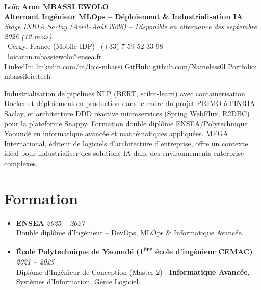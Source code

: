 \documentclass[a4paper,11pt]{article}
\begin{document}
\begin{center}
    {\Large \textbf{Lo\"ic Aron MBASSI EWOLO}} \\ \vspace{4pt}
    \textbf{\large Alternant Ing\'enieur MLOps -- D\'eploiement \& Industrialisation IA} \\
    \textit{\small Stage INRIA Saclay (Avril--Ao\^ut 2026) -- Disponible en alternance d\`es septembre 2026 (12 mois)} \\ \vspace{4pt}
    \small
    \Pointinghand\ Cergy, France (Mobile IDF) \quad \Mobilefone\ (+33) 7 59 52 33 98 \quad
    {\color{primary}\Letter\ \href{mailto:loicaron.mbassiewolo@ensea.fr}{loicaron.mbassiewolo@ensea.fr}} \\ \vspace{2pt}
    {\color{primary}LinkedIn: \href{https://www.linkedin.com/in/loic-mbassi/}{linkedin.com/in/loic-mbassi}} \quad
    {\color{primary}GitHub: \href{https://github.com/Nameless0l}{github.com/Nameless0l}} \quad
    {\color{primary}Portfolio: \href{https://mbassiloic.tech}{mbassiloic.tech}}
\end{center}
\vspace{-6pt}
\noindent\small{Industrialisation de pipelines NLP (BERT, scikit-learn) avec containerisation Docker et d\'eploiement en production dans le cadre du projet PRIMO \`a l'INRIA Saclay, et architecture DDD r\'eactive microservices (Spring WebFlux, R2DBC) pour la plateforme Snappy. Formation double dipl\^ome ENSEA/Polytechnique Yaound\'e en informatique avanc\'ee et math\'ematiques appliqu\'ees. MEGA International, \'editeur de logiciels d'architecture d'entreprise, offre un contexte id\'eal pour industrialiser des solutions IA dans des environnements enterprise complexes.}

\section{Formation}
\begin{itemize}[leftmargin=*, label=\tiny$\bullet$, nosep]
    \item \textbf{ENSEA} \hfill \textit{2025 -- 2027} \\
    \small{Double dipl\^ome d'Ing\'enieur -- DevOps, MLOps \& Informatique Avanc\'ee.}
    \item \textbf{\'Ecole Polytechnique de Yaound\'e (1\textsuperscript{\`ere} \'ecole d'ing\'enieur CEMAC)} \hfill \textit{2021 -- 2025} \\
    \small{Dipl\^ome d'Ing\'enieur de Conception (Master 2) : \textbf{Informatique Avanc\'ee}, Syst\`emes d'Information, G\'enie Logiciel.}
\end{itemize}
\end{document}
